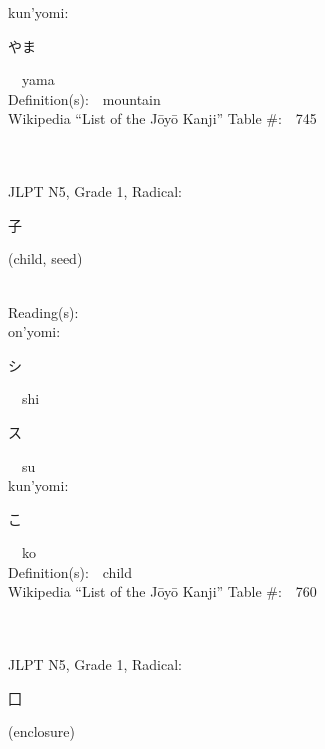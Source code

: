\begin{multicols}{2}
{\hspace*{1em}}kun'yomi:\ \ \\
{\hspace*{2em}}{\begin{CJK}{UTF8}{min} やま \end{CJK}}\ \ yama\ \ \\
Definition(s):\ \ mountain \\
Wikipedia ``List of the J\=oy\=o Kanji'' Table \#:\ \ 745 \\
\ \ \\
{\fontsize{34pt}{40pt}  }\ \ \\  %
{JLPT N5, Grade 1, Radical:\ \ {\begin{CJK}{UTF8}{min} 子 \end{CJK}} (child, seed) } \\
Reading(s):\ \ \\
{\hspace*{1em}}on'yomi:\ \ \\
{\hspace*{2em}}{\begin{CJK}{UTF8}{min} シ \end{CJK}}\ \ shi\ \ \\
{\hspace*{2em}}{\begin{CJK}{UTF8}{min} ス \end{CJK}}\ \ su\ \ \\
{\hspace*{1em}}kun'yomi:\ \ \\
{\hspace*{2em}}{\begin{CJK}{UTF8}{min} こ \end{CJK}}\ \ ko\ \ \\
Definition(s):\ \ child \\
Wikipedia ``List of the J\=oy\=o Kanji'' Table \#:\ \ 760 \\
\ \ \\
{\fontsize{34pt}{40pt}  }\ \ \\  %
{JLPT N5, Grade 1, Radical:\ \ {\begin{CJK}{UTF8}{min} 囗 \end{CJK}} (enclosure) } \\

\end{multicols}
